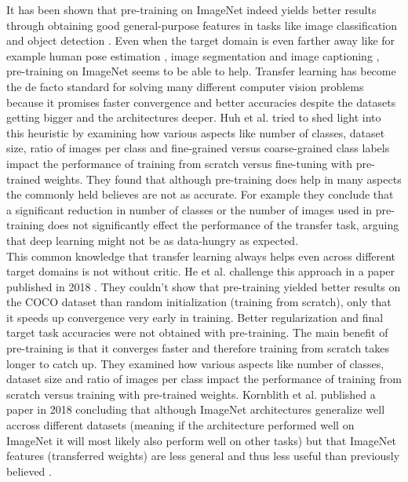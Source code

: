 It has been shown that pre-training on ImageNet indeed yields better results through obtaining good general-purpose features in tasks like image classification \cite{sharif2014cnn} and object detection \cite{girshick2014rich, sermanet2013overfeat}. Even when the target domain is even farther away like for example human pose estimation \cite{carreira2016human}, image segmentation \cite{dai2016instance} and image captioning \cite{donahue2015long, karpathy2015deep}, pre-training on ImageNet seems to be able to help. Transfer learning has become the de facto standard for solving many different computer vision problems because it promises faster convergence and better accuracies despite the datasets getting bigger and the architectures deeper. Huh et al. \cite{huh2016makes} tried to shed light into this heuristic by examining how various aspects like number of classes, dataset size, ratio of  images per class and fine-grained versus coarse-grained class labels impact the performance of training from scratch versus fine-tuning with pre-trained weights. They found that although pre-training does help in many aspects the commonly held believes are not as accurate. For example they conclude that a significant reduction in number of classes or the number of images used in pre-training does not significantly effect the performance of the transfer task, arguing that deep learning might not be as data-hungry as expected.\\


This common knowledge that transfer learning always helps even across different target domains is not without critic. He et al. challenge this approach in a paper published in 2018 \cite{he2018rethinking}. They couldn't show that pre-training yielded better results on the COCO dataset than random initialization (training from scratch), only that it speeds up convergence very early in training. Better regularization and final target task accuracies were not obtained with pre-training. The main benefit of pre-training is that it converges faster and therefore training from scratch takes longer to catch up. They examined how various aspects like number of classes, dataset size and ratio of images per class impact the performance of training from scratch versus training with pre-trained weights.
Kornblith et al. published a paper in 2018 concluding that although ImageNet architectures generalize well accross different datasets (meaning if the architecture performed well on ImageNet it will most likely also perform well on other tasks) but that ImageNet features (transferred weights) are less general and thus less useful than previously believed \cite{kornblith2018better}.


